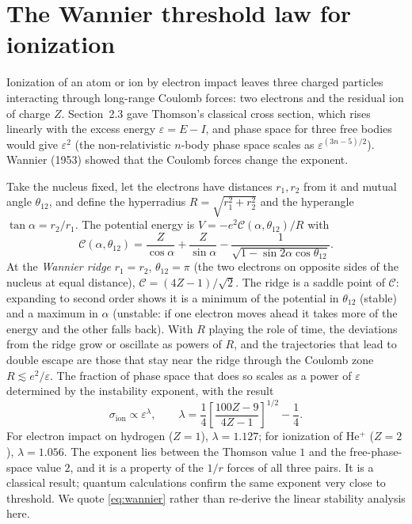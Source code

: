 \documentclass[11pt,a4paper]{book}
\numberwithin{equation}{chapter}
\begin{document}
\section{The Wannier threshold law for ionization}\label{sec:wannier}

Ionization of an atom or ion by electron impact leaves three charged particles
interacting through long-range Coulomb forces: two electrons and the residual ion
of charge $Z$. Section~2.3 gave Thomson's classical cross section, which rises
linearly with the excess energy $\varepsilon=E-I$, and phase space for three free
bodies would give $\varepsilon^2$ (the non-relativistic $n$-body phase space
scales as $\varepsilon^{(3n-5)/2}$). Wannier (1953) showed that the Coulomb forces
change the exponent.

Take the nucleus fixed, let the electrons have distances $r_1,r_2$ from it and mutual
angle $\theta_{12}$, and define the hyperradius $R=\sqrt{r_1^2+r_2^2}$ and the
hyperangle $\tan\alpha=r_2/r_1$. The potential energy is
$V=-e^2\mathcal C(\alpha,\theta_{12})/R$ with
\begin{equation}\label{eq:Wannier-C}
  \mathcal C(\alpha,\theta_{12})=\frac{Z}{\cos\alpha}+\frac{Z}{\sin\alpha}
  -\frac1{\sqrt{1-\sin2\alpha\cos\theta_{12}}} .
\end{equation}
At the \emph{Wannier ridge} $r_1=r_2$, $\theta_{12}=\pi$ (the two electrons on
opposite sides of the nucleus at equal distance), $\mathcal C=(4Z-1)/\sqrt2$. The
ridge is a saddle point of $\mathcal C$: expanding to second order shows it is a
minimum of the potential in $\theta_{12}$ (stable) and a maximum in $\alpha$
(unstable: if one electron moves ahead it takes more of the energy and the other
falls back). With $R$ playing the role of time, the deviations from the ridge
grow or oscillate as powers of $R$, and the trajectories that lead to
double escape are those that stay near the ridge through the Coulomb zone
$R\lesssim e^2/\varepsilon$. The fraction of phase space that does so scales as a
power of $\varepsilon$ determined by the instability exponent, with the result
\begin{equation}\label{eq:wannier}
  \sigma_{\mathrm{ion}}\propto\varepsilon^{\lambda},\qquad
  \lambda=\frac14\left[\frac{100Z-9}{4Z-1}\right]^{1/2}-\frac14 .
\end{equation}
For electron impact on hydrogen ($Z=1$), $\lambda=1.127$; for ionization of
He$^+$ ($Z=2$), $\lambda=1.056$. The exponent lies between the Thomson value $1$
and the free-phase-space value $2$, and it is a property of the $1/r$ forces of all
three pairs. It is a classical result; quantum calculations confirm the same
exponent very close to threshold. We quote \eqref{eq:wannier} rather than
re-derive the linear stability analysis here.
\end{document}
